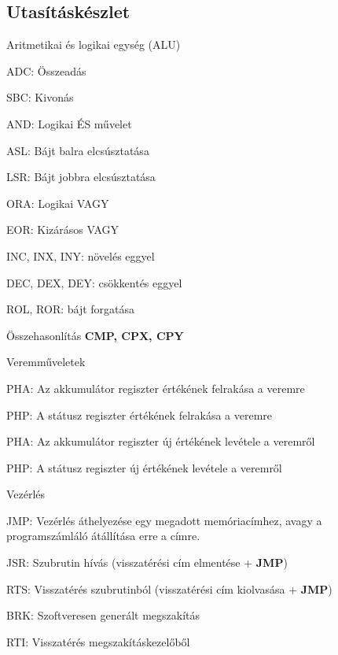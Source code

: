 \subsection{Utasításkészlet}

\begin{compactdesc}
	\item Aritmetikai és logikai egység (ALU)
	\begin{compactdesc}
		\item[ADC:] Összeadás
		\item[SBC:] Kivonás
		\item[AND:] Logikai ÉS művelet
		\item[ASL:] Bájt balra elcsúsztatása
		\item[LSR:] Bájt jobbra elcsúsztatása
		\item[ORA:] Logikai VAGY
		\item[EOR:] Kizárásos VAGY
		\item[INC, INX, INY:] növelés eggyel
		\item[DEC, DEX, DEY:] csökkentés eggyel
		\item[ROL, ROR:] bájt forgatása
	\end{compactdesc}
	\item 
	Összehasonlítás \newline \textbf{CMP, CPX, CPY}
	\item Veremműveletek
	\begin{compactdesc}
		\item[PHA:] Az akkumulátor regiszter értékének felrakása a veremre 
		\item[PHP:] A státusz regiszter értékének felrakása a veremre
		\item[PHA:] Az akkumulátor regiszter új értékének levétele a veremről
		\item[PHP:] A státusz regiszter új értékének levétele a veremről
	\end{compactdesc}
	\item Vezérlés
	\begin{compactdesc}
		\item[JMP:] Vezérlés áthelyezése egy megadott memóriacímhez, avagy a programszámláló átállítása erre a címre.
		\item[JSR:] Szubrutin hívás (visszatérési cím elmentése + \textbf{JMP})
		\item[RTS:] Visszatérés szubrutinból (visszatérési cím kiolvasása + \textbf{JMP})
		\item[BRK:] Szoftveresen generált megszakítás
		\item[RTI:] Visszatérés megszakításkezelőből

\end{compactdesc}
\end{compactdesc}
